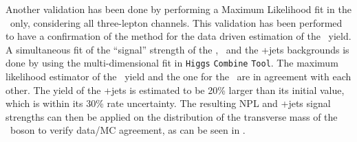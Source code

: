 \newpage
Another validation has been done by performing a Maximum Likelihood fit in the \WZCR\ only, considering all three-lepton channels. This validation has been performed to have a confirmation of the method for the data driven estimation of the \NPL\ yield. A simultaneous fit of the ``signal'' strength of the \NPE, \NPM\ and the \WZ+jets backgrounds is done by using the multi-dimensional fit in \texttt{Higgs} \texttt{Combine} \texttt{Tool}. The maximum likelihood estimator of the \NPM\ yield and the one for the \NPE\ are in agreement with each other.  The yield of the \WZ+jets is estimated to be 20\% larger than its initial value, which is within its 30\% rate uncertainty. The resulting NPL and \WZ+jets signal strengths can then be applied on the distribution of the transverse mass of the \PW\ boson to verify data/MC agreement, as can be seen in . %

